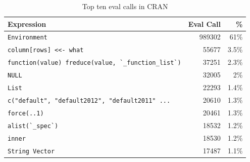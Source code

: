 \documentclass[USenglish,cleveref, autoref, thm-restate]{lipics-v2019}
\renewcommand{\c}[1]{\lstinline{#1}\xspace}
\begin{document}
\begin{table}[!h]  \centering
\begin{tabular}{@{}l@{~}|@{~}r@{~}r@{}} \hline
Expression & Eval Call &  \% \\\hline
\c{Environment} &                                  989302   & 61\%\\
\c{column[rows] <<- what} &                        55677    & 3.5\%\\
\c{function(value) freduce(value, `_function_list`)} & 37251& 2.3\%\\
\c{NULL} &                         32005    & 2\%\\
\c{List} &                         22293    & 1.4\%\\
\c{c("default", "default2012", "default2011" ...}& 20610    & 1.3\%\\
\c{force(..1)}            &                        20461    & 1.3\%\\
\c{alist(`_spec`)}       &                         18532    & 1.2\%\\
\c{inner}               &                          18530    & 1.2\%\\
\c{String Vector}      &                           17487     & 1.1\%\\
\end{tabular}\caption{Top ten eval calls in CRAN} \label{C}
\end{table}
\end{document}
